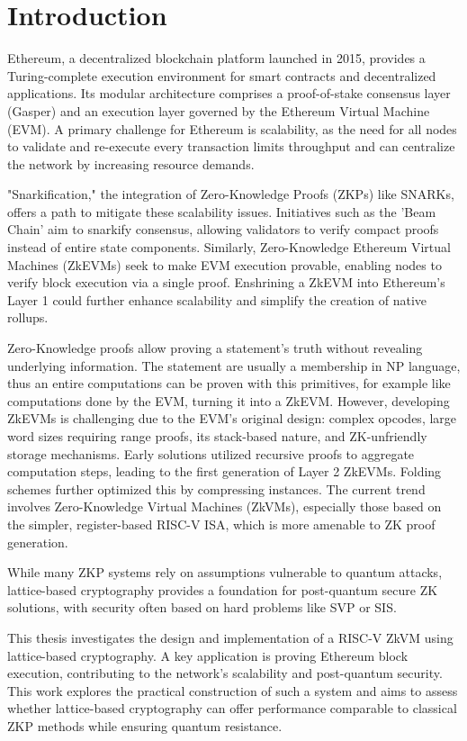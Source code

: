 \chapter{Introduction}

Ethereum, a decentralized blockchain platform launched in 2015, provides a
Turing-complete execution environment for smart contracts and decentralized
applications. Its modular architecture comprises a proof-of-stake consensus
layer (Gasper) and an execution layer governed by the Ethereum Virtual Machine
(EVM). A primary challenge for Ethereum is scalability, as the need for all
nodes to validate and re-execute every transaction limits throughput and can
centralize the network by increasing resource demands.

"Snarkification," the integration of Zero-Knowledge Proofs (ZKPs) like SNARKs,
offers a path to mitigate these scalability issues. Initiatives such as the
'Beam Chain' aim to snarkify consensus, allowing validators to verify compact
proofs instead of entire state components. Similarly, Zero-Knowledge Ethereum
Virtual Machines (ZkEVMs) seek to make EVM execution provable, enabling nodes
to verify block execution via a single proof. Enshrining a ZkEVM into
Ethereum's Layer 1 could further enhance scalability and simplify the creation
of native rollups.

Zero-Knowledge proofs allow proving a statement's truth without revealing
underlying information. The statement are usually a membership in NP language,
thus an entire computations can be proven with this primitives, for example
like computations done by the EVM, turning it into a ZkEVM. However,
developing ZkEVMs is challenging due to the EVM's original design: complex
opcodes, large word sizes requiring range proofs, its stack-based nature, and
ZK-unfriendly storage mechanisms. Early solutions utilized recursive proofs to
aggregate computation steps, leading to the first generation of Layer 2
ZkEVMs. Folding schemes further optimized this by compressing instances. The
current trend involves Zero-Knowledge Virtual Machines (ZkVMs), especially
those based on the simpler, register-based RISC-V ISA, which is more amenable
to ZK proof generation.

While many ZKP systems rely on assumptions vulnerable to quantum attacks,
lattice-based cryptography provides a foundation for post-quantum secure ZK
solutions, with security often based on hard problems like SVP or SIS.

This thesis investigates the design and implementation of a RISC-V ZkVM using
lattice-based cryptography. A key application is proving Ethereum block
execution, contributing to the network's scalability and post-quantum
security. This work explores the practical construction of such a system and
aims to assess whether lattice-based cryptography can offer performance
comparable to classical ZKP methods while ensuring quantum resistance.

